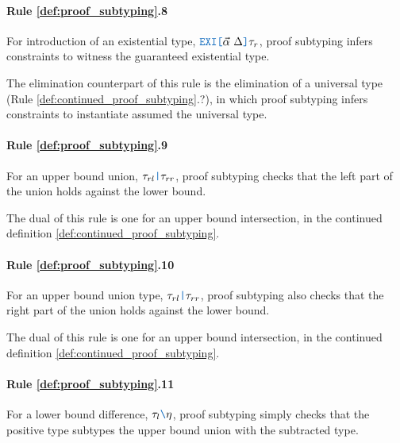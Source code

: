 \documentclass[acmsmall]{acmart}
\theoremstyle{definition}
\begin{document}
\paragraph{Rule \ref{def:proof_subtyping}.8}
For introduction of an existential type, $\obj{EXI[}\vec{\alpha}\ \Delta\obj{]}\tau_r$, proof subtyping
infers constraints to witness the guaranteed existential type. 




The elimination counterpart of this rule is the elimination of a universal type (Rule \ref{def:continued_proof_subtyping}.?), 
in which proof subtyping infers constraints to instantiate assumed the universal type.

\paragraph{Rule \ref{def:proof_subtyping}.9}
For an upper bound union, $\tau_{rl}\obj{|}\tau_{rr}$, 
proof subtyping checks that the left part of the union holds against
the lower bound. 

The dual of this rule is one for an upper bound intersection, 
in the continued definition \ref{def:continued_proof_subtyping}.

\paragraph{Rule \ref{def:proof_subtyping}.10}
For an upper bound union type, $\tau_{rl}\obj{|}\tau_{rr}$, 
proof subtyping also checks that the right part of the union holds against
the lower bound. 

The dual of this rule is one for an upper bound intersection, 
in the continued definition \ref{def:continued_proof_subtyping}.

\paragraph{Rule \ref{def:proof_subtyping}.11}
For a lower bound difference, $\tau_l\obj{\textbackslash}\eta$, proof subtyping
simply checks that the positive type subtypes
the upper bound union with the subtracted type. 
\end{document}
